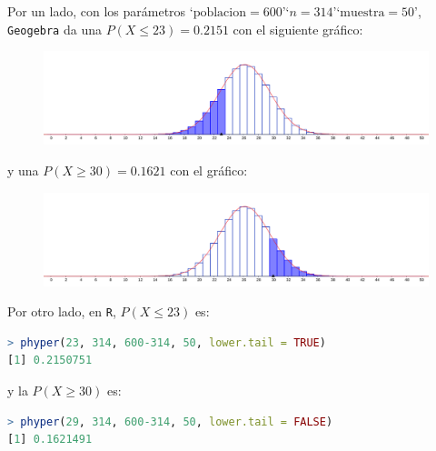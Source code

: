 \begin{sol}
	Por un lado, con los parámetros `$\text{poblacion} = 600$'\;`$n=314$'\;`$\text{muestra} = 50$', \texttt{Geogebra} da una $P(X\leq 23) = 0.2151$ con el siguiente gráfico:
	\begin{figure}[H]
		\includegraphics[width=0.5\linewidth]{pics/g13-1}
		\centering
	\end{figure}\noindent
	y una $P(X\geq 30) = 0.1621$  con el gráfico:
	\begin{figure}[H]
		\includegraphics[width=0.5\linewidth]{pics/g13-2}
		\centering
	\end{figure}\noindent
	Por otro lado, en \texttt{R}, $P(X\leq 23)$ es:
	\begin{lstlisting}[language=R]
> phyper(23, 314, 600-314, 50, lower.tail = TRUE)
[1] 0.2150751
	\end{lstlisting}
	y la $P(X\geq 30)$ es:
	\begin{lstlisting}[language=R]
> phyper(29, 314, 600-314, 50, lower.tail = FALSE)
[1] 0.1621491
	\end{lstlisting}
\end{sol}
